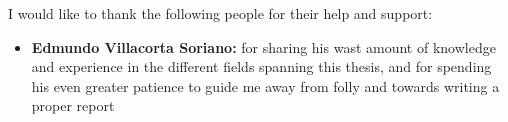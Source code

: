 \documentclass[../main.tex]{subfiles}
\begin{document}
    \begin{acknowledgments}
        I would like to thank the following people for
        their help and support:
        \begin{itemize}
            \item{\textbf{Edmundo Villacorta Soriano:}
            for sharing his wast amount of knowledge and experience
            in the different fields spanning this thesis,
            and for spending his even greater patience to guide me
            away from folly and towards writing a proper report}
        \end{itemize}
    \end{acknowledgments}
\end{document}

